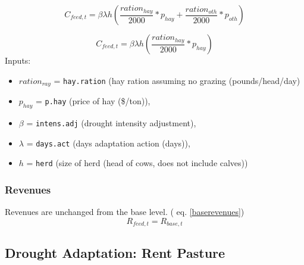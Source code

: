 \documentclass[11pt]{article}
\begin{document}
\begin{equation}
C_{feed,t} = \beta \lambda h \left(\frac{ration_{hay}}{2000} * p_{hay} + \frac{ration_{oth}}{2000} * p_{oth} \right)
\end{equation}

\begin{equation}
C_{feed,t} = \beta \lambda h \left(\frac{ration_{hay}}{2000} * p_{hay} \right)
\end{equation}
Inputs:
\begin{itemize}
\item $ration_{ray}$ = \verb!hay.ration! (hay ration assuming no grazing (pounds/head/day) 
\item $p_{hay}$ = \verb!p.hay! (price of hay (\$/ton)),
\item $\beta$ = \verb!intens.adj! (drought intensity adjustment), 
\item $\lambda$ = \verb!days.act! (days adaptation action (days)), 
\item $h$ = \verb!herd! (size of herd (head of cows, does not include calves))
\end{itemize}

\subsubsection{Revenues}
Revenues are unchanged from the base level. ( eq. \ref{baserevenues})
\begin{equation}
R_{feed,t} = R_{base,t}
\end{equation}

\subsection{Drought Adaptation: Rent Pasture}
\end{document}
